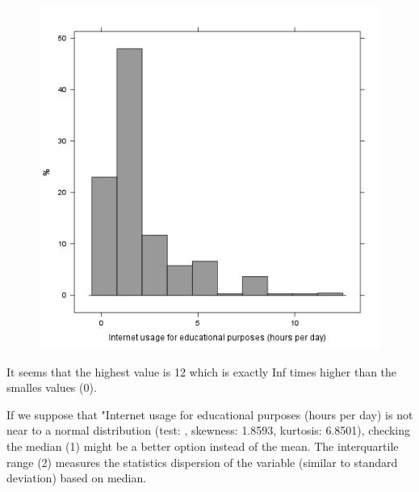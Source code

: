 \documentclass{article}
\makeatletter
\def\maxwidth{\ifdim\Gin@nat@width>\linewidth\linewidth
\else\Gin@nat@width\fi}
\let\Oldincludegraphics\includegraphics
\renewcommand{\includegraphics}[1]{\Oldincludegraphics[width=\maxwidth]{#1}}
\makeatother
\begin{document}
\begin{figure}[htbp]
\centering
\includegraphics{598faf698f82b8217e0ed3137a62daaf.png}
\caption{}
\end{figure}

It seems that the highest value is 12 which is exactly Inf times higher
than the smalles values (0).

If we suppose that "Internet usage for educational purposes (hours per
day) is not near to a normal distribution (test: , skewness: 1.8593,
kurtosis: 6.8501), checking the median (1) might be a better option
instead of the mean. The interquartile range (2) measures the statistics
dispersion of the variable (similar to standard deviation) based on
median.
\end{document}
